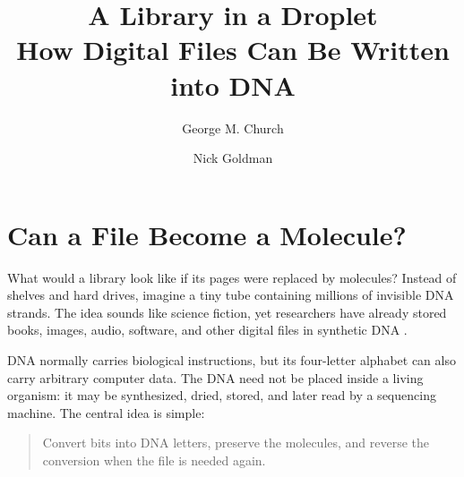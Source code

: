 \documentclass{article}
\begin{document}
\title{\textcolor{blue!30!black}{\textsf{A Library in a Droplet}}\\
    \large How Digital Files Can Be Written into DNA }
\author[1]{George M. Church}
\author[2]{Nick Goldman}


\maketitle


\section{Can a File Become a Molecule?}

What would a library look like if its pages were replaced by molecules? Instead of shelves and hard
drives, imagine a tiny tube containing millions of invisible DNA strands. The idea sounds like science
fiction, yet researchers have already stored books, images, audio, software, and other digital files in
synthetic DNA \cite{church2012}.

DNA normally carries biological instructions, but its four-letter alphabet can also carry arbitrary
computer data. The DNA need not be placed inside a living organism: it may be synthesized, dried,
stored, and later read by a sequencing machine. The central idea is simple:

\begin{quote}
    Convert bits into DNA letters, preserve the molecules, and reverse the conversion when the file is needed again.
\end{quote}
\end{document}
